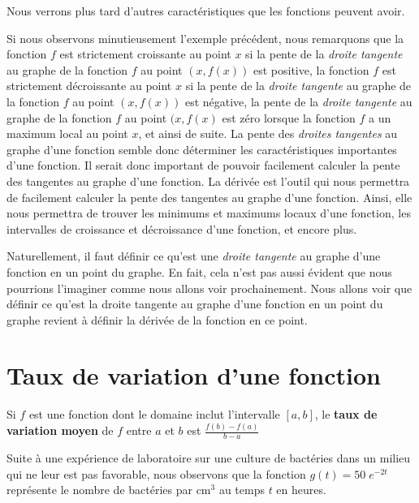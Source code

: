 {

Nous verrons plus tard d'autres caractéristiques que les fonctions peuvent
avoir.

Si nous observons minutieusement l'exemple précédent, nous remarquons que la
fonction $f$ est strictement croissante au point $x$ si la pente de la
{\em droite tangente} au graphe de la fonction $f$ au point $(x,f(x))$
est positive, la fonction $f$ est strictement décroissante au point
$x$ si la pente de la {\em droite tangente} au graphe de la fonction
$f$ au point $(x,f(x))$ est négative, la pente de la
{\em droite tangente} au graphe de la fonction $f$ au point $(x,f(x)$
est zéro lorsque la fonction $f$ a un maximum local au point $x$, et
ainsi de suite.  La pente des {\em droites tangentes} au graphe
d'une fonction semble donc déterminer les caractéristiques importantes
d'une fonction.  Il serait donc important de pouvoir facilement
calculer la pente des tangentes au graphe d'une fonction. La dérivée
est l'outil qui nous permettra de facilement calculer la pente des
tangentes au graphe d'une fonction. Ainsi, elle nous permettra de
trouver les minimums et maximums locaux d'une fonction, les
intervalles de croissance et décroissance d'une fonction, et encore
plus.

Naturellement, il faut définir ce qu'est une {\em droite tangente} au
graphe d'une fonction en un point du graphe.  En fait, cela n'est pas
aussi évident que nous pourrions l'imaginer comme nous allons voir
prochainement.  Nous allons voir que définir ce qu'est la droite tangente au
graphe d'une fonction en un point du graphe revient à définir la
dérivée de la fonction en ce point.

\section{Taux de variation d'une fonction}\label{sect_TVI}

\begin{defn} 
Si $f$ est une fonction dont le domaine inclut l'intervalle $[a,b]$, le
{\bfseries taux de variation moyen} de $f$ entre $a$ et $b$ est
$\displaystyle \frac{f(b)-f(a)}{b-a}$
\end{defn}

\begin{egg}
Suite à une expérience de laboratoire sur une culture de bactéries
dans un milieu qui ne leur est pas favorable, nous observons que la
fonction $\displaystyle g(t) = 50 \; e^{-2t}$ représente le
nombre de bactéries par cm$^3$ au temps $t$ en heures.


\end{egg}}
